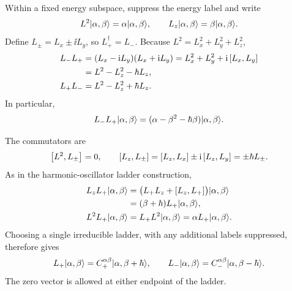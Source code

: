 Within a fixed energy subspace, suppress the energy label and write
\[
 L^2\lvert \alpha,\beta\rangle=\alpha\lvert \alpha,\beta\rangle,
 \qquad L_z\lvert \alpha,\beta\rangle=\beta\lvert \alpha,\beta\rangle.
\]
Define $L_\pm=L_x\pm\ii L_y$, so $L_+^\dagger=L_-$.
Because $L^2=L_x^2+L_y^2+L_z^2$,
\begin{align*}
 L_-L_+&=(L_x-\mathrm{i} L_y)(L_x+\mathrm{i} L_y)
 =L_x^2+L_y^2+\mathrm{i}\left[L_x,L_y\right]\\
 &=L^2-L_z^2-\hbar L_z,\\
 L_+L_-&=L^2-L_z^2+\hbar L_z.
\end{align*}
In particular,
\[
 L_-L_+\lvert \alpha,\beta\rangle
 =(\alpha-\beta^2-\hbar\beta)\lvert \alpha,\beta\rangle.
\]

The commutators are
\[
 \left[L^2,L_\pm\right]=0,\qquad
 \left[L_z,L_\pm\right]
 =\left[L_z,L_x\right]\pm\mathrm{i}\left[L_z,L_y\right]
 =\pm\hbar L_\pm.
\]
As in the harmonic-oscillator ladder construction,
\begin{align*}
 L_zL_+\lvert \alpha,\beta\rangle
 &=\bigl(L_+L_z+\left[L_z,L_+\right]\bigr)\lvert \alpha,\beta\rangle\\
 &=(\beta+\hbar)L_+\lvert \alpha,\beta\rangle,\\
 L^2L_+\lvert \alpha,\beta\rangle
 &=L_+L^2\lvert \alpha,\beta\rangle
 =\alpha L_+\lvert \alpha,\beta\rangle.
\end{align*}
Choosing a single irreducible ladder, with any additional labels
suppressed, therefore gives
\[
 L_+\lvert \alpha,\beta\rangle=C_+^{\alpha\beta}
 \lvert \alpha,\beta+\hbar\rangle,\qquad
 L_-\lvert \alpha,\beta\rangle=C_-^{\alpha\beta}
 \lvert \alpha,\beta-\hbar\rangle.
\]
The zero vector is allowed at either endpoint of the ladder.
